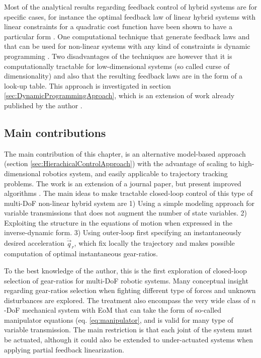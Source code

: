 Most of the analytical results regarding feedback control of hybrid systems are for specific cases, for instance the optimal feedback law of linear hybrid systems with linear constraints for a quadratic cost function have been shown to have a particular form \cite{borrelli_dynamic_2005}. One computational technique that generate feedback laws and that can be used for non-linear systems with any kind of constraints is dynamic programming \cite{donald_e._kirk_optimal_2004}. Two disadvantages of the techniques are however that it is computationally tractable for low-dimensional systems (so called curse of dimensionality) and also that the resulting feedback laws are in the form of a look-up table. This approach is investigated in section \ref{sec:DynamicProgrammingAproach}, which is an extension of work already published by the author \cite{girard_practical_2016}.

\subsection{Main contributions}
\label{sec:maincont}

The main contribution of this chapter, is an alternative model-based approach (section \ref{sec:HierachicalControlApproach}) with the advantage of scaling to high-dimensional robotics system, and easily applicable to trajectory tracking problems. The work is an extension of a journal paper, but present improved algorithms \cite{girard_leveraging_2017}. The main ideas to make tractable closed-loop control of this type of multi-DoF non-linear hybrid system are 1) Using a simple modeling approach for variable transmissions that does not augment the number of state variables. 2) Exploiting the structure in the equations of motion when expressed in the inverse-dynamic form.  3) Using outer-loop first specifying an instantaneously desired acceleration $\ddot{\vec{q}}_r$, which fix locally the trajectory and makes possible computation of optimal instantaneous gear-ratios.

To the best knowledge of the author, this is the first exploration of closed-loop selection of gear-ratios for multi-DoF robotic systems. Many conceptual insight regarding gear-ratios selection when fighting different type of forces and unknown disturbances are explored. The treatment also encompass the very wide class of $n$-DoF mechanical system with EoM that can take the form of so-called manipulator equations (eq. \eqref{eq:manipulator}, and is valid for many type of variable transmission. The main restriction is that each joint of the system must be actuated, although it could also be extended to under-actuated systems when applying partial feedback linearization. 


